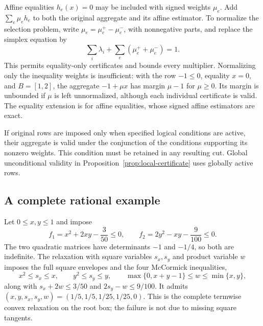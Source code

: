 Affine equalities $h_e(x)=0$ may be included with signed weights
$\mu_e$. Add $\sum_e\mu_e h_e$ to both the original aggregate and
its affine estimator. To normalize the selection problem, write
$\mu_e=\mu_e^+-\mu_e^-$, with nonnegative parts, and replace the
simplex equation by
\[
 \sum_i\lambda_i+\sum_e(\mu_e^++\mu_e^-)=1.
\]
This permits equality-only certificates and bounds every multiplier.
Normalizing only the inequality weights is insufficient: with the
row $-1\leq0$, equality $x=0$, and $B=[1,2]$, the aggregate
$-1+\mu x$ has margin $\mu-1$ for $\mu\geq0$. Its margin is
unbounded if $\mu$ is left unnormalized, although each individual
certificate is valid. The equality extension is for affine
equalities, whose signed affine estimators are exact.

If original rows are imposed only when specified logical conditions
are active, their aggregate is valid under the conjunction of the
conditions supporting its nonzero weights. This condition must be
retained in any resulting cut. Global unconditional validity in
Proposition~\ref{prop:local-certificate} uses globally active rows.

\subsection{A complete rational example}

Let $0\leq x,y\leq1$ and impose
\begin{equation}\label{eq:repair-example}
 f_1=x^2+2xy-\frac3{50}\leq0,
 \qquad
 f_2=2y^2-xy-\frac9{100}\leq0.
\end{equation}
The two quadratic matrices have determinants $-1$ and $-1/4$,
so both are indefinite. The relaxation with square variables
$s_x,s_y$ and product variable $w$ imposes the full square envelopes
and the four McCormick inequalities,
\[
 x^2\leq s_x\leq x,\qquad y^2\leq s_y\leq y,
 \qquad\max\{0,x+y-1\}\leq w\leq\min\{x,y\},
\]
along with $s_x+2w\leq3/50$ and $2s_y-w\leq9/100$.
It admits $(x,y,s_x,s_y,w)=(1/5,1/5,1/25,1/25,0)$.
This is the complete termwise convex relaxation on the root box;
the failure is not due to missing square tangents.

